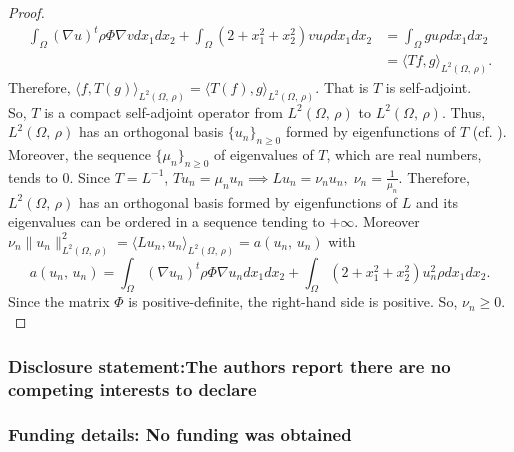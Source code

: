 \documentclass[11pt]{article}
\begin{document}
\begin{proof}
		\begin{align*}
			\int_{\Omega}(\nabla u)^t\rho \Phi\nabla vdx_1dx_2+\int_{\Omega}\left(2+{x_1^2+x_2^2}\right)vu\rho dx_1dx_2
			&=
			\int_{\Omega}gu\rho dx_1dx_2\\
			&=\langle Tf,g\rangle_{L^2\left(\Omega,\,\rho \right)}.
		\end{align*} 
		Therefore, $\langle f,T(g)\rangle_{L^2\left(\Omega,\,\rho \right)}=\langle T(f),g\rangle_{L^2\left(\Omega,\,\rho \right)}$. That is $T$ is self-adjoint.\\
		So, $T$ is a compact self-adjoint operator from $L^2\left(\Omega,\,\rho \right)$ to $L^2\left(\Omega,\,\rho \right)$. Thus,  $L^2\left(\Omega,\,\rho \right)$ has an orthogonal basis $\{u_n\}_{n \geq 0}$ formed by eigenfunctions of $T$ (cf. \cite[Theorem II.6.5]{BOYER}). Moreover, the sequence $\{\mu_n\}_{n \geq 0}$ of eigenvalues of $T$, which are real numbers,   tends to 0.  
		Since $T=L^{-1}$, $Tu_n=\mu_n u_n\implies Lu_n=\nu_n u_n,\;\nu_n=\tfrac{1}{\mu_n}$.
		Therefore, $L^2\left(\Omega,\,\rho \right)$  has an orthogonal basis formed by eigenfunctions of $L$ and its eigenvalues  can be ordered in a sequence tending to $+\infty$. Moreover $\nu_n\|u_n\|^2_{L^2\left(\Omega,\,\rho \right)}=\langle Lu_n,u_n\rangle_{L^2\left(\Omega,\,\rho \right)}=a(u_n,\,u_n)$
		with $$a(u_n,\,u_n)=\int_{\Omega}(\nabla u_n)^t\rho \Phi\nabla u_ndx_1dx_2+\int_{\Omega}\left(2+{x_1^2+x_2^2}\right)u_n^2\rho dx_1dx_2.$$
		Since the matrix $\Phi$ is positive-definite, the right-hand side is positive. So, $\nu_n\geq 0.$
	\end{proof}
	
	\subsubsection*{Disclosure statement:The authors report there are no competing interests to declare}
	\subsubsection*{Funding details: No funding was obtained}
	
\end{document}
